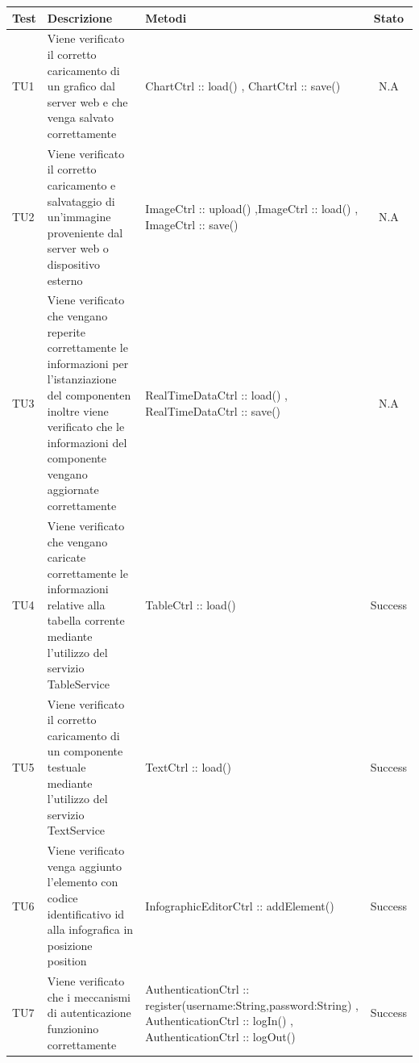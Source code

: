 \begin{table}[h]
	\begin{center}
	\begin{tabular}{|l|p{}|p{}|c|}
	\toprule
		\textbf{Test} & \textbf{Descrizione} & \textbf{Metodi} & \textbf{Stato}\\
		
	\midrule
		TU1 & Viene verificato il corretto caricamento di un grafico dal server web e che venga salvato correttamente & ChartCtrl :: load() , ChartCtrl :: save() & N.A\\
	\midrule
		TU2 & Viene verificato il corretto caricamento e salvataggio di un'immagine proveniente dal server web o dispositivo esterno & ImageCtrl :: upload() ,ImageCtrl :: load() , ImageCtrl :: save() & N.A\\
	\midrule
		TU3 & Viene verificato che vengano reperite correttamente le informazioni per l'istanziazione del componenten inoltre viene verificato che le informazioni del componente vengano aggiornate correttamente & RealTimeDataCtrl :: load() , RealTimeDataCtrl :: save() & N.A\\
	\midrule
		TU4 & Viene verificato che vengano caricate correttamente le informazioni relative alla tabella corrente mediante  l'utilizzo del servizio  TableService & TableCtrl :: load() & Success\\
	\midrule
		TU5 & Viene verificato il corretto caricamento di un componente testuale  mediante l'utilizzo del servizio
TextService & TextCtrl :: load() & Success\\
	\midrule
		TU6 & Viene verificato venga aggiunto l'elemento con codice identificativo id alla infografica
in posizione position & InfographicEditorCtrl :: addElement() & Success\\
	\midrule
		TU7 & Viene verificato che i meccanismi di autenticazione funzionino correttamente & AuthenticationCtrl :: register(username:String,password:String) , AuthenticationCtrl :: logIn() , AuthenticationCtrl :: logOut() & Success\\
\bottomrule
\end{tabular}
\end{center}
\end{table}
